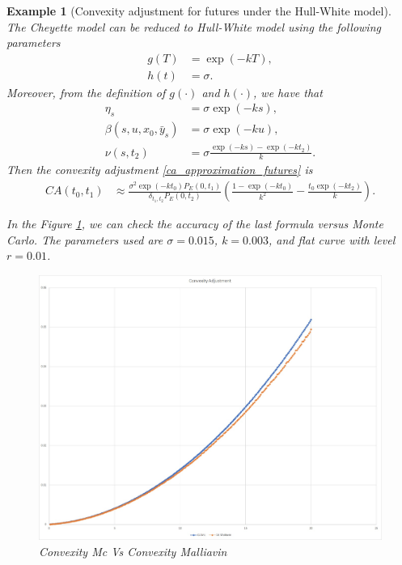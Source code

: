 \documentclass[a4paper,10pt]{article}
\newtheorem{example}[theorem]{Example}
\newcommand{\1}{\mathbf{1}}
\begin{document}
\begin{example}[Convexity adjustment for futures under the Hull-White model]\label{example_ca_future}
The Cheyette model can be reduced to Hull-White model using the following parameters
\begin{align*}
g(T) &= \exp(-kT), \\
h(t) &= \sigma.
\end{align*}
Moreover, from the definition of $g(\cdot)$ and $h(\cdot)$, we have that
\begin{align*}
\eta_s &= \sigma \exp(-ks),\\
\beta(s,u, x_0, \bar{y}_s) &= \sigma \exp(-ku),\\
\nu(s,t_2) &= \sigma \frac{\exp(-ks) - \exp(-kt_2)}{k}.
\end{align*}
Then the convexity adjustment \eqref{ca_approximation_futures} is
\begin{align*}
CA(t_0,t_1) & \approx \frac{\sigma^{2} \exp(-k t_0)  P_{E}(0,t_1)}{\delta_{t_1,t_2} P_{E}(0,t_2)} \left(\frac{1 - \exp(- k t_0)}{k^{2}} - \frac{t_0 \exp(-k t_2)}{k} \right).   
\end{align*}

In the Figure \ref{fig:Futures}, we can check the accuracy of the last formula versus Monte Carlo. The parameters used are $\sigma=0.015$, $k=0.003$, and flat curve with level $r=0.01$.

\begin{figure}[H]
	\begin{center}
		\includegraphics[scale=0.3]{Figures/future_convexity.jpg}
	\end{center}
	\caption{Convexity Mc Vs Convexity Malliavin}
	\label{fig:Futures}
\end{figure} 
\end{example}
\end{document}
